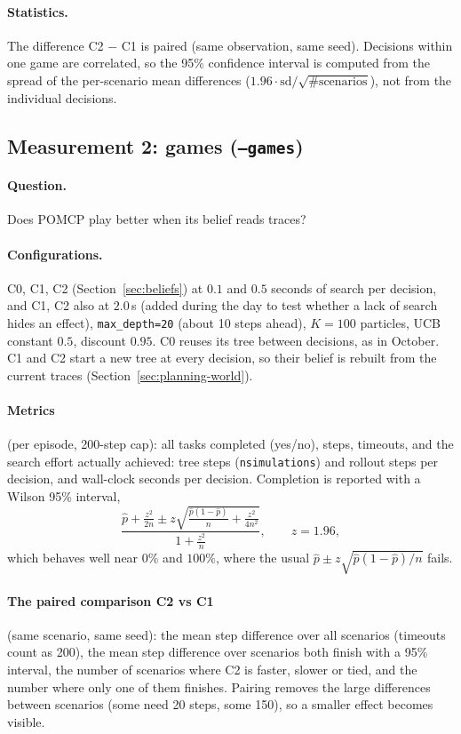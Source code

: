 \documentclass[11pt,a4paper]{article}
\newcommand{\code}[1]{\texttt{#1}}
\theoremstyle{remark}
\begin{document}
\paragraph{Statistics.} The difference C2 $-$ C1 is paired (same observation, same seed). Decisions within one game are
correlated, so the 95\% confidence interval is computed from the spread of the per-scenario mean differences
($1.96\cdot\mathrm{sd}/\sqrt{\#\text{scenarios}}$), not from the individual decisions.

\subsection{Measurement 2: games (\code{--games})}

\paragraph{Question.} Does POMCP play better when its belief reads traces?

\paragraph{Configurations.} C0, C1, C2 (Section~\ref{sec:beliefs}) at $0.1$ and $0.5$ seconds of search per decision,
and C1, C2 also at $2.0$\,s (added during the day to test whether a lack of search hides an effect),
\code{max\_depth=20} (about 10 steps ahead), $K=100$ particles, UCB constant $0.5$, discount $0.95$. C0 reuses its tree
between decisions, as in October. C1 and C2 start a new tree at every decision, so their belief is rebuilt from the
current traces (Section~\ref{sec:planning-world}).

\paragraph{Metrics} (per episode, 200-step cap): all tasks completed (yes/no), steps, timeouts, and the search effort
actually achieved: tree steps (\code{nsimulations}) and rollout steps per decision, and wall-clock seconds per decision.
Completion is reported with a Wilson 95\% interval,
\begin{equation}
  \frac{\hat p + \frac{z^2}{2n} \pm z\sqrt{\frac{\hat p(1-\hat p)}{n} + \frac{z^2}{4n^2}}}{1+\frac{z^2}{n}}, \qquad z=1.96,
\end{equation}
which behaves well near $0\%$ and $100\%$, where the usual $\hat p \pm z\sqrt{\hat p(1-\hat p)/n}$ fails.

\paragraph{The paired comparison C2 vs C1} (same scenario, same seed): the mean step difference over all scenarios
(timeouts count as 200), the mean step difference over scenarios both finish with a 95\% interval, the number of scenarios
where C2 is faster, slower or tied, and the number where only one of them finishes. Pairing removes the large differences
between scenarios (some need 20 steps, some 150), so a smaller effect becomes visible.
\end{document}
